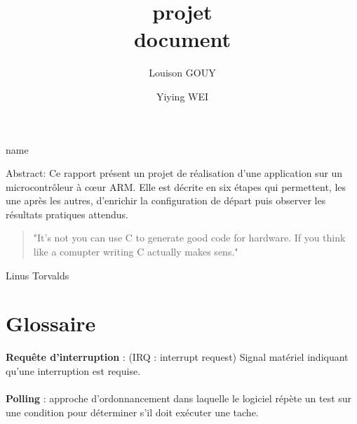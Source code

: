 \documentclass[a4paper]{article}
\title{\textbf{projet} \\ document}
\author{Louison GOUY \and Yiying WEI}
\begin{document}
\maketitle

\vspace{2cm}

\begin{center}
\end{center}

\vspace*{1cm}

\begin{center}
    name
\end{center}

\vspace*{7cm}

\begin{center}

Abstract: Ce rapport présent un projet de réalisation d'une application sur un microcontrôleur à cœur ARM. Elle est décrite en six étapes qui permettent, les une après les autres, d'enrichir la configuration de départ puis observer les résultats pratiques attendus.

\end{center}

\newpage
\vspace*{3cm}
\begin{quotation}
	"It's not you can use C to generate good code for hardware. If you think like a comupter writing C actually makes sens."
\end{quotation}
\begin{flushright}
	Linus Torvalds
\end{flushright} 
\newpage


\newpage
\renewcommand{\contentsname}{Table des Matières}
\tableofcontents
\newpage
\renewcommand\listfigurename{Liste des figures}
\listoffigures
\newpage

\section{Glossaire}

\textbf{Requête d'interruption} : (IRQ : interrupt request) Signal matériel indiquant qu'une interruption est requise. \\ ~ \\

\textbf{Polling} : approche d'ordonnancement dans laquelle le logiciel répète un test sur une condition pour déterminer s'il doit exécuter une tache.\cite{ARM_book} \\ ~ \\
\end{document}
